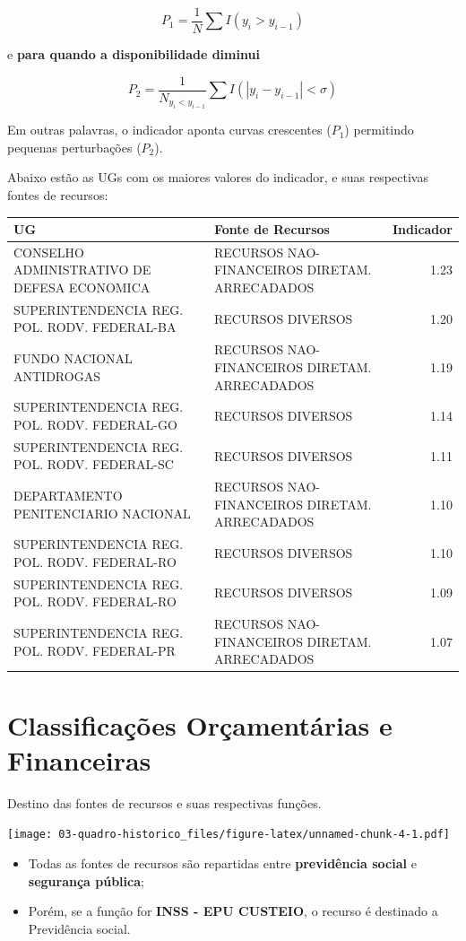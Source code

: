\documentclass[]{book}
\providecommand{\tightlist}{%
  \setlength{\itemsep}{0pt}\setlength{\parskip}{0pt}}
\begin{document}
\[
P_1 = \frac{1}{N}\sum I(y_i > y_{i - 1})
\]

e \textbf{para quando a disponibilidade diminui}

\[
P_2 = \frac{1}{N_{y_i < y_{i - 1}}}\sum I(|y_i -y_{i - 1}| < \sigma)
\]

Em outras palavras, o indicador aponta curvas crescentes (\(P_1\)) permitindo pequenas perturbações (\(P_2\)).

Abaixo estão as UGs com os maiores valores do indicador, e suas respectivas fontes de recursos:

\begin{tabular}{l|l|r}
\hline
UG & Fonte de Recursos & Indicador\\
\hline
CONSELHO ADMINISTRATIVO DE DEFESA ECONOMICA & RECURSOS NAO-FINANCEIROS DIRETAM. ARRECADADOS & 1.23\\
\hline
SUPERINTENDENCIA REG. POL. RODV. FEDERAL-BA & RECURSOS DIVERSOS & 1.20\\
\hline
FUNDO NACIONAL ANTIDROGAS & RECURSOS NAO-FINANCEIROS DIRETAM. ARRECADADOS & 1.19\\
\hline
SUPERINTENDENCIA REG. POL. RODV. FEDERAL-GO & RECURSOS DIVERSOS & 1.14\\
\hline
SUPERINTENDENCIA REG. POL. RODV. FEDERAL-SC & RECURSOS DIVERSOS & 1.11\\
\hline
DEPARTAMENTO PENITENCIARIO NACIONAL & RECURSOS NAO-FINANCEIROS DIRETAM. ARRECADADOS & 1.10\\
\hline
SUPERINTENDENCIA REG. POL. RODV. FEDERAL-RO & RECURSOS DIVERSOS & 1.10\\
\hline
SUPERINTENDENCIA REG. POL. RODV. FEDERAL-RO & RECURSOS DIVERSOS & 1.09\\
\hline
SUPERINTENDENCIA REG. POL. RODV. FEDERAL-PR & RECURSOS NAO-FINANCEIROS DIRETAM. ARRECADADOS & 1.07\\
\hline
\end{tabular}

\hypertarget{classificacoes-orcamentarias-e-financeiras}{%
\section{Classificações Orçamentárias e Financeiras}\label{classificacoes-orcamentarias-e-financeiras}}

Destino das fontes de recursos e suas respectivas funções.

\texttt{[image: 03-quadro-historico\_files/figure-latex/unnamed-chunk-4-1.pdf]}

\begin{itemize}
\tightlist
\item
  Todas as fontes de recursos são repartidas entre \textbf{previdência social} e \textbf{segurança pública};
\item
  Porém, se a função for \textbf{INSS - EPU CUSTEIO}, o recurso é destinado a Previdência social.
\end{itemize}
\end{document}
